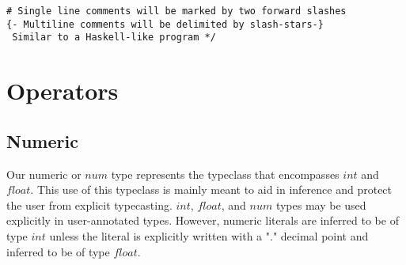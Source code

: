 ﻿\documentclass[5pt]{article}
\begin{document}
\noindent \texttt{\# Single line comments will be marked by two forward slashes} \\

\noindent \texttt{\{- Multiline comments will be delimited by slash-stars-\} } \\
\texttt{ \hspace*{3mm} Similar to a Haskell-like program */} \\

\newpage 

\section{Operators}
\subsection{Numeric}
Our numeric or $num$ type represents the typeclass that encompasses $int$ and
$float$. This use of this typeclass is mainly meant to aid in inference and
protect the user from explicit typecasting. $int$, $float$, and $num$ types may
be used explicitly in user-annotated types. However, numeric literals are
inferred to be of type $int$ unless the literal is explicitly written with a "."
decimal point and inferred to be of type $float$.
\end{document}
